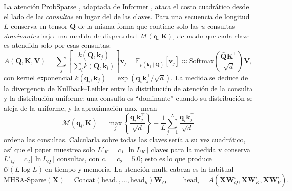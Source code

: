 La atención ProbSparse \citep{wu_deep_sparse_conformer_2022}, adaptada de Informer \citep{zhou_informer_2021}, ataca el costo cuadrático desde el lado de las \emph{consultas} en lugar del de las claves. Para una secuencia de longitud $L$ conserva un tensor $\bar{\mathbf{Q}}$ de la misma forma que contiene solo las $u$ consultas \emph{dominantes} bajo una medida de dispersidad $\mathcal{M}(\mathbf{q}, \mathbf{K})$, de modo que cada clave es atendida solo por esas consultas:
\begin{equation}
A(\mathbf{Q},\mathbf{K},\mathbf{V}) = \sum_j \left[\frac{k(\mathbf{Q},\mathbf{k}_j)}{\sum_l k(\mathbf{Q},\mathbf{k}_l)}\right]\mathbf{v}_j
= \mathbb{E}_{p(\mathbf{k}_j\mid\mathbf{Q})}[\mathbf{v}_j]
\approx \mathrm{Softmax}\!\left(\frac{\bar{\mathbf{Q}}\mathbf{K}^{\top}}{\sqrt{d}}\right)\mathbf{V},
\end{equation}
con kernel exponencial $k(\mathbf{q}_i,\mathbf{k}_j)=\exp(\mathbf{q}_i\mathbf{k}_j^{\top}/\sqrt{d})$. La medida se deduce de la divergencia de Kullback--Leibler entre la distribución de atención de la consulta y la distribución uniforme: una consulta es ``dominante'' cuando su distribución se aleja de la uniforme, y la aproximación max--mean
\begin{equation}
\bar{\mathcal{M}}(\mathbf{q}_i,\mathbf{K}) = \max_j\left\{\frac{\mathbf{q}_i\mathbf{k}_j^{\top}}{\sqrt{d}}\right\} - \frac{1}{L}\sum_{j=1}^{L}\frac{\mathbf{q}_i\mathbf{k}_j^{\top}}{\sqrt{d}}
\end{equation}
ordena las consultas. Calcularla sobre todas las claves sería a su vez cuadrático, así que el paper muestrea solo $L'_K = c_1\lceil\ln L_K\rceil$ claves para la medida y conserva $L'_Q = c_2\lceil\ln L_Q\rceil$ consultas, con $c_1=c_2=5.0$; esto es lo que produce $\mathcal{O}(L\log L)$ en tiempo y memoria. La atención multi-cabeza es la habitual
\begin{equation}
\mathrm{MHSA\text{-}Sparse}(\mathbf{X}) = \mathrm{Concat}(\mathrm{head}_1,\dots,\mathrm{head}_h)\mathbf{W}_O,
\qquad
\mathrm{head}_i = A(\mathbf{X}\mathbf{W}_Q^i,\mathbf{X}\mathbf{W}_K^i,\mathbf{X}\mathbf{W}_V^i).
\end{equation}


